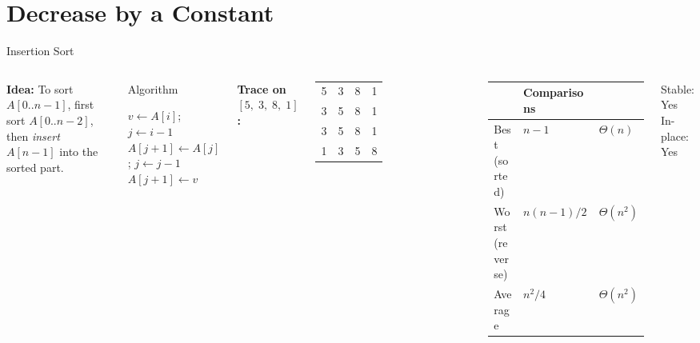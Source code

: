 \documentclass[aspectratio=169]{beamer}
\begin{document}
\section{Decrease by a Constant}

\begin{frame}[shrink=12]{Insertion Sort}
  \begin{columns}[T]
      \textbf{Idea:} To sort $A[0..n{-}1]$, first sort $A[0..n{-}2]$,
      then \emph{insert} $A[n{-}1]$ into the sorted part.

      \vspace{0.3em}
      \begin{block}{Algorithm}
        \begin{algorithmic}[1]
            \State $v \gets A[i]$;\; $j \gets i-1$
              \State $A[j{+}1] \gets A[j]$;\; $j \gets j-1$
            \EndWhile
            \State $A[j{+}1] \gets v$
          \EndFor
        \end{algorithmic}
      \end{block}
      \textbf{Trace on $[5,\;3,\;8,\;1]$:}
      \vspace{0.2em}

      \begin{tabular}{cccc}
        \rowcolor{PrimaryDark}\color{white}5&\color{white}3&\color{white}8&\color{white}1 \\
        \rowcolor{PrimaryLight!40}3&5&8&1 \\
        3&5&8&1 \\
        \rowcolor{PrimaryLight!40}1&3&5&8 \\
      \end{tabular}
      \vspace{0.4em}

      \begin{tabular}{lll}
        \toprule
        & \textbf{Comparisons} & \\
        \midrule
        Best (sorted)   & $n-1$ & $\Theta(n)$ \\
        Worst (reverse) & $n(n-1)/2$ & $\Theta(n^2)$ \\
        Average         & $n^2/4$ & $\Theta(n^2)$ \\
        \bottomrule
      \end{tabular}
      \vspace{0.2em}
      Stable: \textcolor{SuccessGreen}{Yes} \quad In-place: \textcolor{SuccessGreen}{Yes}
  \end{columns}
\end{frame}
\end{document}
